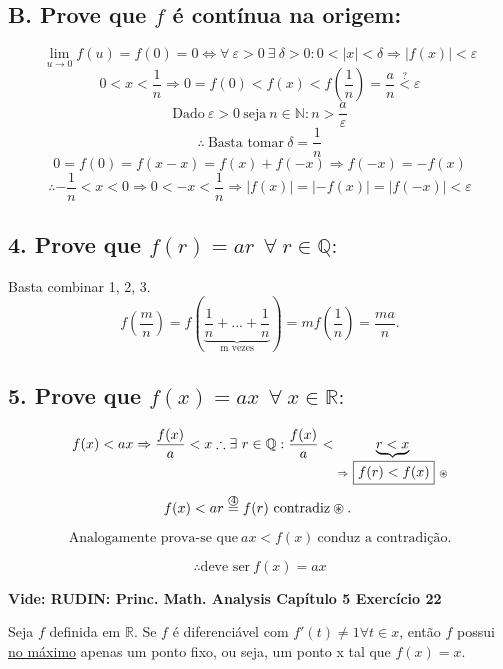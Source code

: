 \documentclass{article}
\begin{document}
\subsection*{B. Prove que $f$ é contínua na origem:}
\[
\lim_{u\rightarrow 0} f(u) = f(0) = 0 \Leftrightarrow \forall \ \varepsilon > 0 \ \exists \ \delta > 0 : 0 < \left | x \right | < \delta \Rightarrow \left | f(x) \right | < \varepsilon
\]
\[
0 < x < \frac{1}{n} \Rightarrow 0 = f(0) < f(x) < f(\frac{1}{n}) = \frac{a}{n} \overset{?}{<} \varepsilon
\]
\[
\text{Dado} \ \varepsilon > 0 \ \text{seja} \ n \in \mathbb{N}: n > \frac{a}{\varepsilon }
\]
\[
\therefore \ \text{Basta tomar} \ \delta = \frac{1}{n}
\]
\[
0 = f(0) = f(x-x) = f(x) + f(-x) \Rightarrow f(-x) = -f(x)
\]
\[
\therefore -\frac{1}{n} < x < 0 \Rightarrow 0 < -x < \frac{1}{n} \Rightarrow \left | f(x) \right | = \left | -f(x) \right | = \left | f(-x) \right | < \varepsilon
\]

\vspace{1em}
\subsection*{4. Prove que $f(r) = ar \ \ \forall \ r \in \mathbb{Q}:$} Basta combinar 1, 2, 3.
\[f(\frac{m}{n}) = f(\underbrace{\frac{1}{n} + ... + \frac{1}{n}}_\text{m vezes}) = m f(\frac{1}{n}) = \frac{ma}{n}.\]

\vspace{1em}
\subsection*{5. Prove que $f(x) = ax \ \ \forall \ x \in \mathbb{R}:$}
\[
f(x) < ax \Rightarrow \frac{f(x)}{a} < x \therefore \exists \ r \in \mathbb{Q}: \frac{f(x)}{a} < \underbrace{r < x}_{\Rightarrow \ \fbox{$f(r) <  f(x)$}\ \circledast}
\]
\[
f(x) < ar \overset{\text{\textcircled{4}}}{=} f(r) \ \text{contradiz} \circledast. \
\]

\[
\text{Analogamente prova-se que} \ ax < f(x) \ \text{conduz a contradição.}
\]

\[
\therefore \text{deve ser} \ f(x) = ax
\]

\pagebreak

 \textbf{Vide: RUDIN: Princ. Math. Analysis Capítulo 5 Exercício 22}

Seja $f$ definida em $\mathbb{R}$. Se  $f$ é diferenciável com $f'(t) \neq  1  \forall  t \in x$, então $f$ possui \underline{no máximo} apenas um ponto fixo, ou seja, um ponto x tal que $f(x) = x$.
\end{document}
